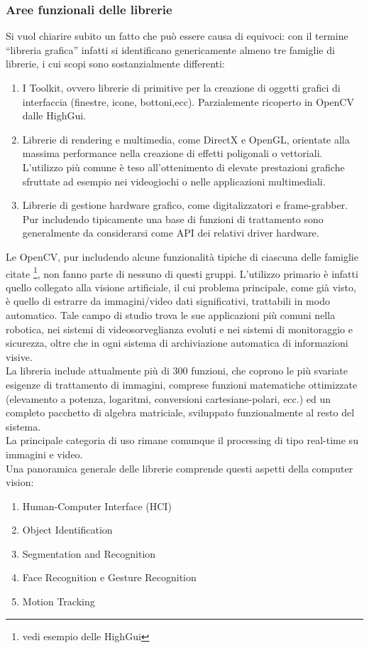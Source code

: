 \subsubsection{Aree funzionali delle librerie}\label{AreeFunz}
Si vuol chiarire subito un fatto che può essere causa di equivoci: con il termine ``libreria grafica'' infatti si identificano genericamente almeno tre famiglie di librerie, i cui scopi sono sostanzialmente differenti:
\begin{enumerate}
 \item  I Toolkit, ovvero librerie di primitive per la creazione di oggetti grafici di interfaccia (finestre, icone, bottoni,ecc). Parzialemente ricoperto in OpenCV dalle HighGui.
\item Librerie di rendering e multimedia, come DirectX e OpenGL, orientate alla massima performance nella creazione di effetti poligonali o vettoriali. L’utilizzo più comune è teso all’ottenimento di elevate prestazioni    grafiche sfruttate ad esempio nei videogiochi o nelle applicazioni multimediali.
\item  Librerie di gestione hardware grafico, come digitalizzatori e frame-grabber. Pur includendo tipicamente una base di funzioni di trattamento sono generalmente da considerarsi come API dei relativi driver hardware.
\end{enumerate}

Le OpenCV, pur includendo alcune funzionalità tipiche di ciascuna delle famiglie citate \footnote{vedi esempio delle HighGui}, non fanno parte di nessuno di questi gruppi. L’utilizzo primario è infatti quello collegato alla visione artificiale, il cui problema principale, come già visto, è quello di estrarre da immagini/video dati significativi, trattabili in modo automatico. Tale campo di studio trova le sue applicazioni più comuni nella robotica, nei sistemi di  videosorveglianza evoluti e nei sistemi di monitoraggio e sicurezza, oltre che in ogni sistema di archiviazione automatica di informazioni visive.\\

La libreria include attualmente più di 300 funzioni, che coprono le più svariate esigenze di trattamento di immagini, comprese funzioni matematiche ottimizzate (elevamento a potenza, logaritmi, conversioni cartesiane-polari, ecc.) ed  un completo pacchetto di algebra matriciale, sviluppato funzionalmente al resto del sistema.\\

La principale categoria di uso rimane comunque il processing di tipo real-time su immagini e video. \\
Una panoramica generale delle librerie comprende questi aspetti della computer vision:
\begin{enumerate}
\item Human-Computer Interface (HCI)
\item Object Identification
\item Segmentation and Recognition
\item Face Recognition e Gesture Recognition
\item Motion Tracking
\end{enumerate}

